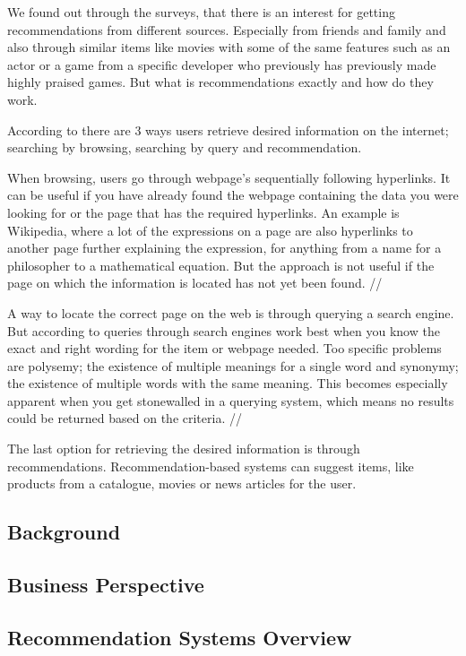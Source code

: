 We found out through the surveys, that there is an interest for getting recommendations from different sources. Especially from friends and family and also through similar items like movies with some of the same features such as an actor or a game from a specific developer who previously has previously made highly praised games. But what is recommendations exactly and how do they work.

According to \cite{TheAdaptiveWeb} there are 3 ways users retrieve desired information on the internet; searching by browsing, searching by query and recommendation.

When browsing, users go through webpage's sequentially following hyperlinks. It can be useful if you have already found the webpage containing the data you were looking for or the page that has the required hyperlinks. An example is Wikipedia, where a lot of the expressions on a page are also hyperlinks to another page further explaining the expression, for anything from a name for a philosopher to a mathematical equation. But the approach is not useful if the page on which the information is located has not yet been found. //

A way to locate the correct page on the web is through querying a search engine. But according to \cite{TheAdaptiveWeb} queries through search engines work best when you know the exact and right wording for the item or webpage needed. Too specific problems are polysemy; the existence of multiple meanings for a single word and synonymy; the existence of multiple words with the same meaning. This becomes especially apparent when you get stonewalled in a querying system, which means no results could be returned based on the criteria. //

The last option for retrieving the desired information is through recommendations. Recommendation-based systems can suggest items, like products from a catalogue, movies or news articles for the user.


\subsection{Background}
\label{Background}

\subsection{Business Perspective}
\label{BusiPers}

\subsection{Recommendation Systems Overview}
\label{Overview}
